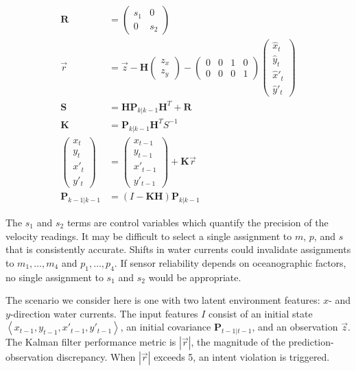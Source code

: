 \documentclass[letterpaper]{article}
\begin{document}
\begin{align}
\mathbf{R} &= \begin{pmatrix}
s_1 & 0 \\
0 & s_2
\end{pmatrix} \\
\vec{r} &= \vec{z} - \mathbf{H}
\begin{pmatrix}
z_x \\
z_y
\end{pmatrix}
-
\begin{pmatrix}
0 & 0 & 1 & 0 \\
0 & 0 & 0 & 1
\end{pmatrix}
\begin{pmatrix}
\hat{x}_t \\
\hat{y}_t \\
\hat{x}'_t \\
\hat{y}'_t
\end{pmatrix} \\
\mathbf{S} &= \mathbf{H} \mathbf{P}_{k|k-1} \mathbf{H}^T + \mathbf{R} \\
\mathbf{K} &= \mathbf{P}_{k|k-1} \mathbf{H}^T S^{-1} \\
\begin{pmatrix}
x_{t} \\
y_{t} \\
x'_{t} \\
y'_{t}
\end{pmatrix} &= 
\begin{pmatrix}
x_{t-1} \\
y_{t-1} \\
x'_{t-1} \\
y'_{t-1}
\end{pmatrix} + \mathbf{K} \vec{r} \\
\mathbf{P}_{k-1|k-1} &= (I - \mathbf{K} \mathbf{H}) \mathbf{P}_{k|k-1}
\end{align}

The $s_1$ and $s_2$ terms are control variables which quantify the precision of the velocity readings.
It may be difficult to select a single assignment to $m$, $p$, and $s$ that is consistently accurate.
Shifts in water currents could invalidate assignments to $m_1, \ldots, m_4$ and $p_1, \ldots, p_4$.
If sensor reliability depends on oceanographic factors, no single assignment to $s_1$ and $s_2$ would be appropriate.

The scenario we consider here is one with two latent environment features: $x$- and $y$-direction water currents.
The input features $I$ consist of an initial state $\left< x_{t-1}, y_{t-1}, x'_{t-1}, y'_{t-1} \right>$, an initial covariance $\mathbf{P}_{t-1|t-1}$, and an observation $\vec{z}$.
The Kalman filter performance metric is $| \vec{r} |$, the magnitude of the prediction-observation discrepancy.
When $| \vec{r} |$ exceeds 5, an intent violation is triggered.
\end{document}
